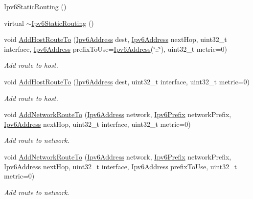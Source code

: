 \begin{DoxyCompactItemize}
\item 
\hyperlink{classns3_1_1Ipv6StaticRouting_a1f9a909686971c59e89905cb46194fee}{Ipv6\+Static\+Routing} ()
\item 
virtual \hyperlink{classns3_1_1Ipv6StaticRouting_a561af2f913a1531c82dde4745f7b2172}{$\sim$\+Ipv6\+Static\+Routing} ()
\item 
void \hyperlink{classns3_1_1Ipv6StaticRouting_a9c09d10eb7d7d67c29bdc05bb620c241}{Add\+Host\+Route\+To} (\hyperlink{classns3_1_1Ipv6Address}{Ipv6\+Address} dest, \hyperlink{classns3_1_1Ipv6Address}{Ipv6\+Address} next\+Hop, uint32\+\_\+t interface, \hyperlink{classns3_1_1Ipv6Address}{Ipv6\+Address} prefix\+To\+Use=\hyperlink{classns3_1_1Ipv6Address}{Ipv6\+Address}(\char`\"{}\+::\char`\"{}), uint32\+\_\+t metric=0)
\begin{DoxyCompactList}\small\item\em Add route to host. \end{DoxyCompactList}\item 
void \hyperlink{classns3_1_1Ipv6StaticRouting_a108d89b7940a31f2648d9ccff0ec0923}{Add\+Host\+Route\+To} (\hyperlink{classns3_1_1Ipv6Address}{Ipv6\+Address} dest, uint32\+\_\+t interface, uint32\+\_\+t metric=0)
\begin{DoxyCompactList}\small\item\em Add route to host. \end{DoxyCompactList}\item 
void \hyperlink{classns3_1_1Ipv6StaticRouting_ac0c0c9d8e3182295c1cdb4a3d612a2d3}{Add\+Network\+Route\+To} (\hyperlink{classns3_1_1Ipv6Address}{Ipv6\+Address} network, \hyperlink{classns3_1_1Ipv6Prefix}{Ipv6\+Prefix} network\+Prefix, \hyperlink{classns3_1_1Ipv6Address}{Ipv6\+Address} next\+Hop, uint32\+\_\+t interface, uint32\+\_\+t metric=0)
\begin{DoxyCompactList}\small\item\em Add route to network. \end{DoxyCompactList}\item 
void \hyperlink{classns3_1_1Ipv6StaticRouting_adc37dbd1518eaadfd0c88161a7bb85ae}{Add\+Network\+Route\+To} (\hyperlink{classns3_1_1Ipv6Address}{Ipv6\+Address} network, \hyperlink{classns3_1_1Ipv6Prefix}{Ipv6\+Prefix} network\+Prefix, \hyperlink{classns3_1_1Ipv6Address}{Ipv6\+Address} next\+Hop, uint32\+\_\+t interface, \hyperlink{classns3_1_1Ipv6Address}{Ipv6\+Address} prefix\+To\+Use, uint32\+\_\+t metric=0)
\begin{DoxyCompactList}\small\item\em Add route to network. \end{DoxyCompactList}\item 

\end{DoxyCompactItemize}
